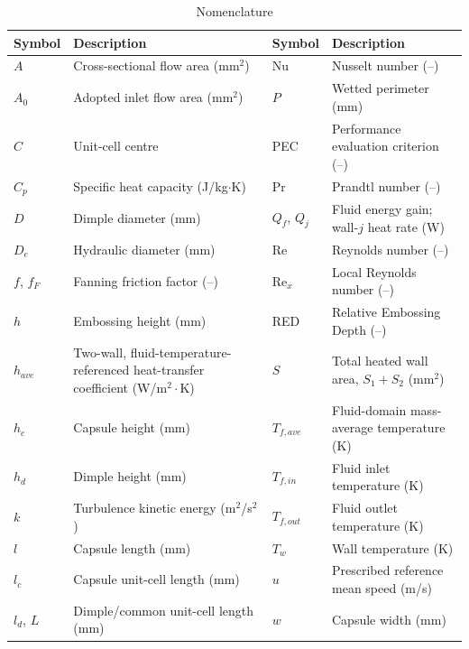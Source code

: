 \documentclass[energies,article,submit,moreauthors,noheaderline]{Definitions/mdpi}
\def\quad{ }%
\begin{document}
\fancyheadoffset[L]{0pt}
\fancyfootoffset[L]{0pt}

\begin{table}[H]
\caption{Nomenclature}
\centering
\scriptsize
\renewcommand{\arraystretch}{1.05}
\begin{tabularx}{\textwidth}{@{}l>{\raggedright\arraybackslash}X@{\quad}l>{\raggedright\arraybackslash}X@{}}
\hline
\textbf{Symbol} & \textbf{Description} & \textbf{Symbol} & \textbf{Description} \\
\hline
$A$         & Cross-sectional flow area (mm$^2$) & Nu          & Nusselt number (--) \\
$A_0$       & Adopted inlet flow area (mm$^2$) & $P$ & Wetted perimeter (mm) \\
$C$         & Unit-cell centre & PEC & Performance evaluation criterion (--) \\
$C_p$       & Specific heat capacity (J/kg$\cdot$K) & Pr          & Prandtl number (--) \\
$D$         & Dimple diameter (mm) & $Q_f$, $Q_j$ & Fluid energy gain; wall-$j$ heat rate (W) \\
$D_e$       & Hydraulic diameter (mm) & Re          & Reynolds number (--) \\
$f$, $f_F$  & Fanning friction factor (--) & $\mathrm{Re}_x$ & Local Reynolds number (--) \\
$h$         & Embossing height (mm) & RED         & Relative Embossing Depth (--) \\
$h_{ave}$ & Two-wall, fluid-temperature-referenced heat-transfer coefficient (W/m$^2\cdot$K) & $S$         & Total heated wall area, $S_1+S_2$ (mm$^2$) \\
$h_c$       & Capsule height (mm) & $T_{f,ave}$ & Fluid-domain mass-average temperature (K) \\
$h_d$       & Dimple height (mm) & $T_{f,in}$ & Fluid inlet temperature (K) \\
$k$         & Turbulence kinetic energy (m$^2$/s$^2$) & $T_{f,out}$ & Fluid outlet temperature (K) \\
$l$         & Capsule length (mm)  & $T_w$       & Wall temperature (K) \\
$l_c$       & Capsule unit-cell length (mm) & $u$         & Prescribed reference mean speed (m/s) \\
$l_d$, $L$  & Dimple/common unit-cell length (mm) & $w$         & Capsule width (mm) \\

\end{tabularx}
\end{table}
\end{document}
